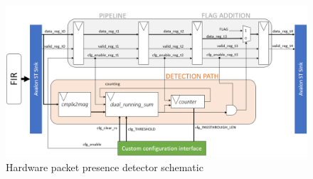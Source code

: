 \begin{figure}[h]
    \centering
    \includegraphics[width=\linewidth]{figures/packet_presence_detection.png}
    \caption{Hardware packet presence detector schematic}
    \label{fig:pd_schematic}
\end{figure}

